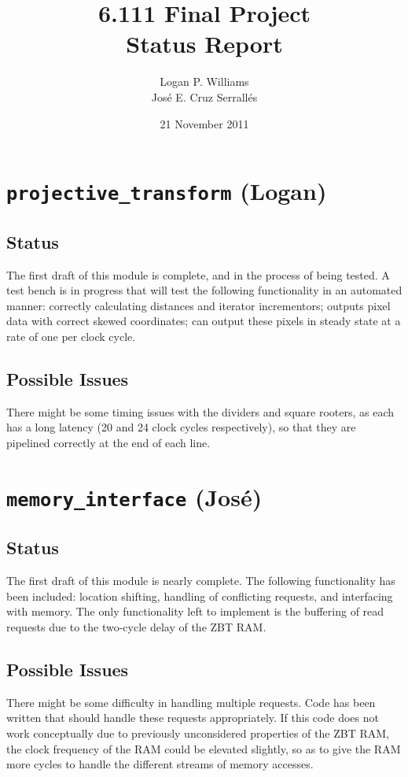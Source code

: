 \documentclass{article}
\title{6.111 Final Project\\Status Report}
\author{Logan P. Williams\\Jos\'{e} E. Cruz Serrall\'{e}s}
\date{21 November 2011}
\begin{document}
\maketitle


\section{{\tt projective\_transform} (Logan)}
\subsection{Status} The first draft of this module is complete, and in the process of being tested. A test bench is in progress that will test the following functionality in an automated manner: correctly calculating distances and iterator incrementors; outputs pixel data with correct skewed coordinates; can output these pixels in steady state at a rate of one per clock cycle.
\subsection{Possible Issues} There might be some timing issues with the dividers and square rooters, as each has a long latency (20 and 24 clock cycles respectively), so that they are pipelined correctly at the end of each line.

\section{{\tt memory\_interface} (Jos\'{e})}
\subsection{Status} The first draft of this module is nearly complete. The following functionality has been included: location shifting, handling of conflicting requests, and interfacing with memory. The only functionality left to implement is the buffering of read requests due to the two-cycle delay of the ZBT RAM. 
\subsection{Possible Issues} There might be some difficulty in handling multiple requests. Code has been written that should handle these requests appropriately. If this code does not work conceptually due to previously unconsidered properties of the ZBT RAM, the clock frequency of the RAM could be elevated slightly, so as to give the RAM more cycles to handle the different streams of memory accesses.
\end{document}
